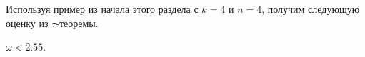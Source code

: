 Используя пример из начала этого раздела с $k=4$ и $n=4$, получим следующую оценку из $\tau$-теоремы.
\begin{corollary}
	$\omega < 2.55$.
\end{corollary}





























